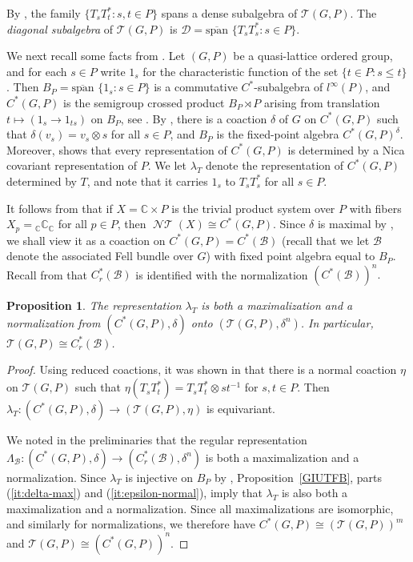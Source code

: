 \documentclass[12pt]{amsart}
\theoremstyle{plain}
\newtheorem{prop}[theorem]{Proposition}
\theoremstyle{remark}
\theoremstyle{definition}
\numberwithin{equation}{section}
\theoremstyle{plain}
\theoremstyle{definition}
\theoremstyle{remark}
\begin{document}
By \cite[Proposition 3.2]{N}, the family $\{T_sT_t^*: s,t \in P\}$ spans a dense subalgebra of ${\mathcal T}(G, P)$.
The \emph{diagonal subalgebra} of ${\mathcal T}(G, P)$ is ${\mathcal D}={\operatorname{\overline{span\!}\,\,}}\{T_sT_s^*: s\in P\}$.

We next recall some facts from \cite{LacR1}. Let $(G, P)$ be a quasi-lattice ordered group, and for each $s\in P$
write $1_s$ for the characteristic function  of the set $\{t\in P:s\leq t\}$.
Then  $B_P={\operatorname{\overline{span\!}\,\,}}\{1_s: s\in P\}$ is a commutative $C^*$-subalgebra of
$l^\infty(P)$, and $C^*(G,P)$ is the semigroup
crossed product $B_P\rtimes P$ arising from translation $t\mapsto (1_s\to 1_{ts})$ on $B_P$, see
\cite[Corollary 2.4]{LacR1}. By \cite[\S 6.1]{LacR1}, there is a coaction
$\delta$ of $G$ on $C^*(G,P)$ such that $\delta(v_s)=v_s\otimes s$ for all $s\in P$, and  $B_P$ is
the fixed-point algebra  $C^*(G,P)^\delta$.  Moreover,
\cite[Proposition 2.3]{LacR1} shows that every representation of $C^*(G,P)$ is determined by a
Nica covariant representation of $P$. We let ${\lambda_T}$ denote the representation of $C^*(G, P)$
determined by $T$, and note that it carries $1_s$ to $T_sT_s^*$ for all $s\in P$.

It follows from \cite[Proposition 5.6]{SY} that if  $X={{\mathbb{{C}}}}\times P$ is the
trivial product system over $P$ with fibers $X_p={}_{{\mathbb{{C}}}}{{\mathbb{{C}}}}_{{\mathbb{{C}}}}$ for all $p\in P$, then ${\operatorname{\mathcal{NT}}}(X)\cong C^*(G,P)$.
Since $\delta$  is maximal by \cite[Remark 4.5]{CLSV}, we shall view it
as a coaction on $C^*(G, P)=C^*(\mathcal{B})$ (recall that we let $\mathcal B$ denote the associated Fell bundle over $G$) with fixed point algebra equal to $B_P$. Recall
from \cite{EQ} that $C^*_r(\mathcal{B})$ is identified with the normalization $(C^*(\mathcal{B}))^n.$

\begin{prop}\label{prop:normalising-delta}
The representation $\lambda_T$ is both a maximalization and a normalization from
$(C^*(G, P), \delta)$ onto $({\mathcal T}(G, P), \delta^n)$. In particular,
${\mathcal T}(G, P)\cong C^*_r(\mathcal{B})$.
\end{prop}

\begin{proof}
Using reduced coactions, it was shown in \cite[Proposition 6.5]{QuiggRa} that there is a
normal coaction $\eta$  on ${\mathcal T}(G, P)$ such that $\eta(T_sT_t^*)=T_sT_t^*\otimes st^{-1}$ for $s,t \in P$.
Then $\lambda_T: (C^*(G, P), \delta)\to ({\mathcal T}(G, P), \eta)$ is equivariant.

We noted in the preliminaries that the regular representation
$\Lambda_{\mathcal B}:(C^*(G, P), \delta)\to (C^*_r(\mathcal{B}), \delta^n)$ is both a
maximalization and a normalization. Since $\lambda_T$
is injective on $B_P$ by \cite[Corollary 2.4(1)]{LacR1}, Proposition~\ref{GIUTFB}, parts (\ref{it:delta-max}) and (\ref{it:epsilon-normal}),
imply that $\lambda_T$ is also both a maximalization and a normalization.
Since all maximalizations are isomorphic, and similarly for normalizations, we therefore have $C^*(G, P)\cong ({\mathcal T}(G, P))^m$ and
 ${\mathcal T}(G, P)\cong (C^*(G, P))^n$.
\end{proof}
\end{document}
